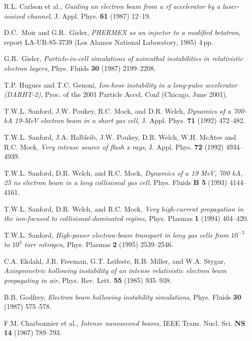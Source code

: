 \documentclass [12pt,a4paper,     ]{report} %
\begin{document}
\begin{enumerate}
 R.L. Carlson et al., \emph{Guiding an electron beam from a rf accelerator by a laser-ionized channel}, J. Appl. Phys. {\bf 61} (1987) 12--19.

  D.C.\ Moir and G.R.\ Gisler, \emph{PHERMEX as an injector to a modified betatron}, report LA-UR-85-3739 (Los Alamos National Laboratory, 1985) 4\,pp.

 G.R.\ Gisler, \emph{Particle-in-cell simulations of azimuthal instabilities in relativistic electron layers}, Phys. Fluids {\bf 30} (1987) 2199--2208.

 T.P. Hugues and T.C. Genoni, \emph{Ion-hose instability in a long-pulse accelerator (DARHT-2)}, Proc. of the 2001 Particle Accel. Conf (Chicago, June 2001).

 T.W.L. Sanford, J.W. Poukey, R.C. Mock, and D.R. Welch, \emph{Dynamics of a 700-kA 19-MeV electron beam in a short gas cell}, J. Appl. Phys. {\bf 71} (1992) 472--482.

 T.W.L. Sanford, J.A. Halbleib, J.W. Poukey, D.R. Welch, W.H. McAtee and R.C. Mock, \emph{Very intense source of flash x rays}, J. Appl. Phys. {\bf 72} (1992) 4934--4939.

 T.W.L. Sanford, D.R. Welch, and R.C. Mock, \emph{Dynamics of a  19 MeV, 700 kA, 25 ns electron beam in a long collisional gas cell}, Phys. Fluids {\bf B 5} (1993) 4144--4161.

 T.W.L. Sanford, D.R. Welch, and R.C. Mock, \emph{Very high-current propagation in the ion-focused to collisional-dominated regime}, Phys. Plasmas {\bf 1} (1994) 404--420.

 T.W.L. Sanford, \emph{High-power electron-beam transport in long gas cells from $10^{-3}$ to $10^{3}$ torr nitrogen},  Phys. Plasmas {\bf 2} (1995) 2539--2546.

 C.A. Ekdahl, J.R. Freeman, G.T. Leifeste, R.B. Miller, and W.A. Stygar, \emph{Axisymmetric hollowing instability of an intense relativistic electron beam propagating in air}, Phys. Rev. Lett. {\bf 55} (1985) 935--938.

  B.B. Godfrey, \emph{Electron beam hollowing instability simulations}, Phys. Fluids {\bf 30} (1987) 575--578.

 F.M. Charbonnier et al., \emph{Intense nanosecond beams}, IEEE Trans. Nucl. Sci. {\bf NS 14} (1967) 789--793.


\end{enumerate}
\end{document}
